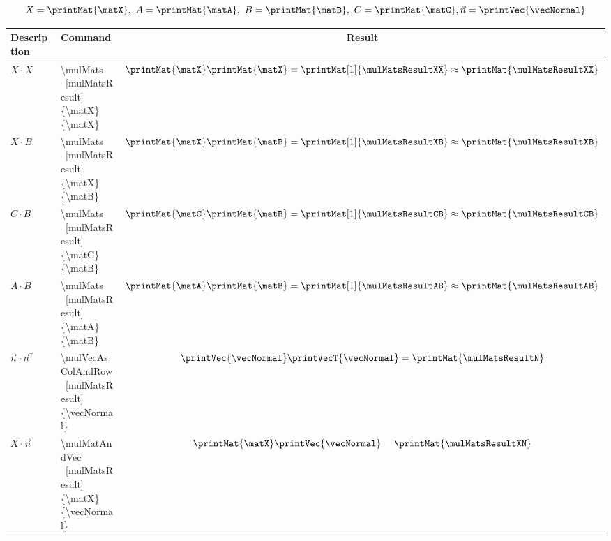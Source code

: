 \documentclass[10pt, a4paper]{article}
\begin{document}
\mulMats[mulMatsResultXX]{\matX}{\matX}
\mulMats[mulMatsResultXB]{\matX}{\matB}
\mulMats[mulMatsResultCB]{\matC}{\matB}
\mulMats[mulMatsResultAB]{\matA}{\matB}

\mulVecAsColAndRow[mulMatsResultN]{\vecNormal}

\mulMatAndVec[mulMatsResultXN]{\matX}{\vecNormal}

\[
    X = \printMat{\matX},\ A = \printMat{\matA},\ B = \printMat{\matB},\ C = \printMat{\matC}, \vec{n} = \printVec{\vecNormal}
\]

\begin{center}
    \begin{tabular}{ l l c }
        Description & Command & Result\\ \hline
        \(X \cdot X\) &
        \makecell[l]{\textbackslash mulMats\\\ [mulMatsResult]\\\{\textbackslash matX\}\{\textbackslash matX\}} &
        \(\printMat{\matX} \printMat{\matX} = \printMat[1]{\mulMatsResultXX} \approx \printMat{\mulMatsResultXX}\)\\
        \(X \cdot B\) &
        \makecell[l]{\textbackslash mulMats\\\ [mulMatsResult]\\\{\textbackslash matX\}\{\textbackslash matB\}} &
        \(\printMat{\matX} \printMat{\matB} = \printMat[1]{\mulMatsResultXB} \approx \printMat{\mulMatsResultXB}\)\\
        \(C \cdot B\) &
        \makecell[l]{\textbackslash mulMats\\\ [mulMatsResult]\\\{\textbackslash matC\}\{\textbackslash matB\}} &
        \(\printMat{\matC} \printMat{\matB} = \printMat[1]{\mulMatsResultCB} \approx \printMat{\mulMatsResultCB}\)\\
        \(A \cdot B\) &
        \makecell[l]{\textbackslash mulMats\\\ [mulMatsResult]\\\{\textbackslash matA\}\{\textbackslash matB\}} &
        \(\printMat{\matA} \printMat{\matB} = \printMat[1]{\mulMatsResultAB} \approx \printMat{\mulMatsResultAB}\)\\
        \(\vec{n} \cdot {\vec{n}}\mkern-1mu^{\mathsf{T}}\) &
        \makecell[l]{\textbackslash mulVecAsColAndRow\\\ [mulMatsResult]\\\{\textbackslash vecNormal\}} &
        \(\printVec{\vecNormal} \printVecT{\vecNormal} = \printMat{\mulMatsResultN}\)\\
        \(X \cdot \vec{n}\) &
        \makecell[l]{\textbackslash mulMatAndVec\\\ [mulMatsResult]\\\{\textbackslash matX\}\{\textbackslash vecNormal\}} &
        \(\printMat{\matX} \printVec{\vecNormal} = \printMat{\mulMatsResultXN}\)
    \end{tabular}
\end{center}
\end{document}
